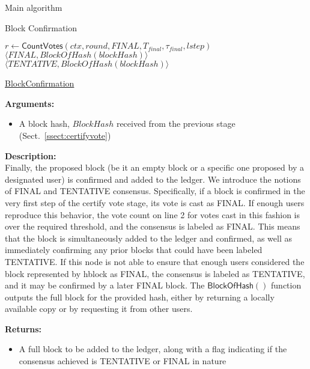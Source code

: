 \documentclass[10pt,a4paper]{article}
\begin{document}
\begin{section}{Main algorithm}
\begin{subsection}{Block Confirmation}
\begin{algorithm}[H]
    \begin{algorithmic}[H]

    \State $r \gets \mathsf{CountVotes}(ctx, round, FINAL, T_{final}, \tau_{final}, lstep)$
        \State \Return $\langle FINAL, BlockOfHash(blockHash)\rangle$ 
    \Else
    {
        \State \Return $\langle TENTATIVE, BlockOfHash(blockHash)\rangle $
    }
    \EndIf
    \EndFunction
    \end{algorithmic}
    \caption{\underline{BlockConfirmation}}
\end{algorithm}


\noindent \textbf{Arguments:}
\begin{itemize}
    \item A block hash, $BlockHash$ received from the previous stage (Sect.~\ref{ssect:certifyvote})
  \end{itemize}

\noindent \textbf{Description:}\\
Finally, the proposed block (be it an empty block or a specific one 
proposed by a designated user) is confirmed and added to the ledger.
We introduce the notions of FINAL and TENTATIVE consensus.
Specifically, if a block is confirmed in the very first step of the
certify vote stage, its vote is cast as FINAL.
If enough users reproduce this behavior, the vote count on line 2 for 
votes cast in this fashion is over the required threshold, and the 
consensus is labeled as FINAL.
This means that the block is simultaneously added to the ledger and 
confirmed, as well as immediately confirming any prior blocks that 
could have been labeled TENTATIVE.
If this node is not able to ensure that enough users considered the 
block represented by hblock as FINAL, the consensus is labeled as 
TENTATIVE, and it may be confirmed by a later FINAL block.
The $\mathsf{BlockOfHash}()$ function outputs the full block for the provided 
hash, either by returning a locally available copy or by requesting 
it from other users.

\noindent \textbf{Returns:}
\begin{itemize}
    \item A full block to be added to the ledger, along with a flag indicating if
    the consensus achieved is TENTATIVE or FINAL in nature
  \end{itemize}

\end{subsection}
\end{section}
\end{document}

